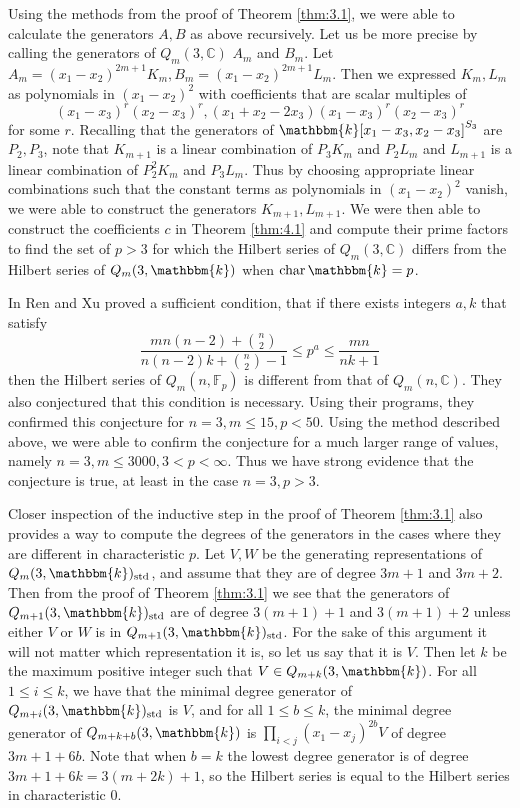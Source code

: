\documentclass[11pt]{article}
\theoremstyle{definition}
\renewcommand{\k}{\mathbbm{k}}
\newcommand{\std}{\mathrm{std}}
\renewcommand{\char}{\text{char\,}}
\newcommand{\C}{\mathbb{C}}
\begin{document}
Using the methods from the proof of Theorem \ref{thm:3.1}, we were able to calculate the generators $A,B$ as above recursively. Let us be more precise by calling the generators of $Q_m(3,\C)$ $A_m$ and $B_m$. Let $A_m=(x_1-x_2)^{2m+1}K_m,B_m=(x_1-x_2)^{2m+1}L_m$. Then we expressed $K_m,L_m$ as polynomials in $(x_1-x_2)^2$ with coefficients that are scalar multiples of 
$$(x_1-x_3)^r(x_2-x_3)^r,(x_1+x_2-2x_3)(x_1-x_3)^r(x_2-x_3)^r$$
for some $r$. Recalling that the generators of $\k[x_1-x_3,x_2-x_3]^{S_3}$ are $P_2,P_3$, note that $K_{m+1}$ is a linear combination of $P_3K_m$ and $P_2L_m$ and $L_{m+1}$ is a linear combination of $P_2^2K_m$ and $P_3L_m$. Thus by choosing appropriate linear combinations such that the constant terms as polynomials in $(x_1-x_2)^2$ vanish, we were able to construct the generators $K_{m+1},L_{m+1}$. We were then able to construct the coefficients $c$ in Theorem \ref{thm:4.1} and compute their prime factors to find the set of $p>3$ for which the Hilbert series of $Q_m(3,\C)$ differs from the Hilbert series of $Q_m(3,\k)$ when $\char \k=p$. 

In \cite{Ren_2020} Ren and Xu proved a sufficient condition, that if there exists integers $a,k$ that satisfy
\begin{equation}\label{eq:4.1}
    \frac{mn(n-2)+{n\choose{2}}}{n(n-2)k+{n\choose{2}}-1}\leq p^a\leq\frac{mn}{nk+1}\tag{4.1}
\end{equation}
then the Hilbert series of $Q_m(n,\mathbb{F}_p)$ is different from that of $Q_m(n,\C)$. They also conjectured that this condition is necessary. Using their programs, they confirmed this conjecture for $n=3,$\linebreak$m\leq 15, p<50$. Using the method described above, we were able to confirm the conjecture for a much larger range of values, namely $n=3,m\leq3000,3<p<\infty$. Thus we have strong evidence that the conjecture is true, at least in the case $n=3,p>3$.

Closer inspection of the inductive step in the proof of Theorem \ref{thm:3.1} also provides a way to compute the degrees of the generators in the cases where they are different in characteristic $p$. Let $V,W$ be the generating representations of $Q_m(3,\k)_\std$, and assume that they are of degree $3m+1$ and $3m+2$. Then from the proof of Theorem \ref{thm:3.1} we see that the generators of $Q_{m+1}(3,\k)_\std$ are of degree $3(m+1)+1$ and $3(m+1)+2$ unless either $V$ or $W$ is in $Q_{m+1}(3,\k)_\std$. For the sake of this argument it will not matter which representation it is, so let us say that it is $V$. Then let $k$ be the maximum positive integer such that $V\in Q_{m+k}(3,\k)$. For all $1\leq i\leq k$, we have that the minimal degree generator of $Q_{m+i}(3,\k)_\std$ is $V$, and for all $1\leq b\leq k$, the minimal degree generator of $Q_{m+k+b}(3,\k)$ is $\prod_{i<j}(x_1-x_j)^{2b}V$ of degree $3m+1+6b$. Note that when $b=k$ the lowest degree generator is of degree $3m+1+6k=3(m+2k)+1$, so the Hilbert series is equal to the Hilbert series in characteristic 0. 
\end{document}
